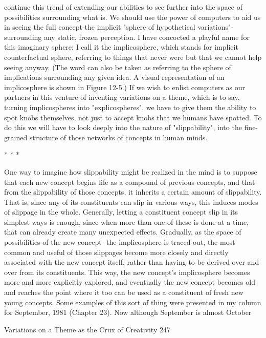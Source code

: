 continue this trend of extending our abilities to see further into the space of
possibilities surrounding what is. We should use the power of computers to aid us in
seeing the full concept-the implicit "sphere of hypothetical variations"-surrounding
any static, frozen perception.
        I have concocted a playful name for this imaginary sphere: I call it the
implicosphere, which stands for implicit counterfactual sphere, referring to things that
never were but that we cannot help seeing anyway. (The word can also be taken as
referring to the sphere of implications surrounding any given idea. A visual
representation of an implicosphere is shown in Figure 12-5.) If we wish to enlist
computers as our partners in this venture of inventing variations on a theme, which is
to say, turning implicospheres into "explicospheres", we have to give them the ability
to spot knobs themselves, not just to accept knobs that we humans have spotted. To
do this we will have to look deeply into the nature of "slippability", into the fine-
grained structure of those networks of concepts in human minds.

                                        *   *   *

        One way to imagine how slippability might be realized in the mind is to
suppose that each new concept begins life as a compound of previous concepts, and
that from the slippability of those concepts, it inherits a certain amount of slippability.
That is, since any of its constituents can slip in various ways, this induces modes of
slippage in the whole. Generally, letting a constituent concept slip in its simplest ways
is enough, since when more than one of these is done at a time, that can already create
many unexpected effects. Gradually, as the space of possibilities of the new concept-
the implicosphere-is traced out, the most common and useful of those slippages
become more closely and directly associated with the new concept itself, rather than
having to be derived over and over from its constituents. This way, the new concept's
implicosphere becomes more and more explicitly explored, and eventually the new
concept becomes old and reaches the point where it too can be used as a constituent of
fresh new young concepts.
        Some examples of this sort of thing were presented in my column for
September, 1981 (Chapter 23). Now although September is almost October




Variations on a Theme as the Crux of Creativity                                        247

